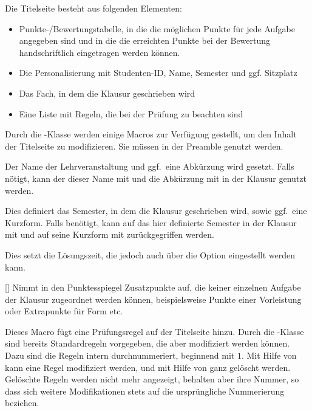 \documentclass[
load=osgexam,
babel=ngerman
]{skdoc}
\begin{document}
Die Titelseite besteht aus folgenden Elementen:
\begin{itemize}[nosep]
  \item Punkte-/Bewertungstabelle, in die die möglichen Punkte für jede Aufgabe angegeben sind und in die die erreichten Punkte bei
    der Bewertung handschriftlich eingetragen werden können.
  \item Die Personalisierung mit Studenten-ID, Name, Semester und ggf. Sitzplatz
  \item Das Fach, in dem die Klausur geschrieben wird
  \item Eine Liste mit Regeln, die bei der Prüfung zu beachten sind
\end{itemize}
Durch die \thepkg-Klasse werden einige Macros zur Verfügung gestellt, um den Inhalt der Titelseite zu modifizieren.
Sie müssen in der Preamble genutzt werden.

\DescribeMacro{} Der Name der Lehrveranstaltung und ggf.\ eine Abkürzung wird
gesetzt. Falls nötigt, kann der dieser Name mit  und die Abkürzung mit  in
der Klausur genutzt werden.

\DescribeMacro{} Dies definiert das Semester, in dem die Klausur geschrieben wird,
sowie ggf.\ eine Kurzform. Falls benötigt, kann auf das hier definierte Semester in der Klausur mit
 und auf seine Kurzform mit  zurückgegriffen werden.
\medskip

\DescribeMacro{} Dies setzt die Lösungszeit, die jedoch auch über die Option 
eingestellt werden kann.

[]{} Nimmt in den Punktesspiegel Zusatzpunkte auf, die
keiner einzelnen Aufgabe der Klausur zugeordnet werden können, beispielsweise Punkte einer Vorleistung oder Extrapunkte
für Form etc.

Dieses Macro fügt eine Prüfungsregel auf der Titelseite hinzu. Durch die \thepkg-Klasse sind bereits Standardregeln
vorgegeben, die aber modifiziert werden können. Dazu sind die Regeln intern durchnummeriert, beginnend mit $1$. Mit
Hilfe von  kann eine Regel modifiziert werden,
und mit Hilfe von  ganz gelöscht werden. Gelöschte Regeln werden
nicht mehr angezeigt, behalten aber ihre Nummer, so dass sich weitere Modifikationen stets auf die ursprüngliche
Nummerierung beziehen.
\end{document}

